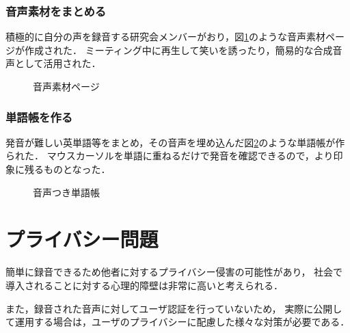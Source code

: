 \subsubsection{音声素材をまとめる}
積極的に自分の声を録音する研究会メンバーがおり，図\ref{hayakawa}のような音声素材ページが作成された．
ミーティング中に再生して笑いを誘ったり，簡易的な合成音声として活用された．

\begin{figure}[H]
\centering
{}
\caption{音声素材ページ}
\label{hayakawa}
\end{figure}

\subsubsection{単語帳を作る}
発音が難しい英単語等をまとめ，その音声を埋め込んだ図\ref{word}のような単語帳が作られた．
マウスカーソルを単語に重ねるだけで発音を確認できるので，より印象に残るものとなった．

\begin{figure}[H]
\centering
{}
\caption{音声つき単語帳}
\label{word}
\end{figure}

\section{プライバシー問題}
簡単に録音できるため他者に対するプライバシー侵害の可能性があり，
社会で導入されることに対する心理的障壁は非常に高いと考えられる\cite{Kawamura}．

また，録音された音声に対してユーザ認証を行っていないため，
実際に公開して運用する場合は，ユーザのプライバシーに配慮した様々な対策が必要である．